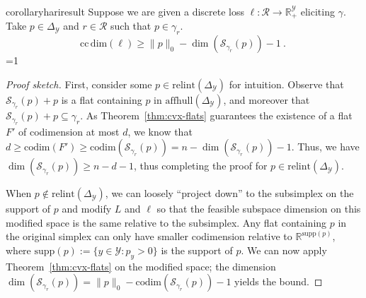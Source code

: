 \documentclass{article}
\newcommand{\Comments}{1}
\newcommand{\mytodo}[2]{\ifnum\Comments=1%
	\todo[linecolor=#1!80!black,backgroundcolor=#1,bordercolor=#1!80!black]{#2}\fi}
\newcommand{\btw}[1]{\mytodo{gray!10!white}{\textcolor{gray}{BTW: #1}}}%
\newcommand{\reals}{\mathbb{R}}
\newcommand{\simplex}{\Delta_\Y}
\newcommand{\relint}[1]{\mathrm{relint}(#1)}
\newcommand{\ccdim}{\mathrm{cc\,dim}}
\newcommand{\codim}{\mathrm{codim}}
\newcommand{\supp}{\mathrm{supp}}
\newcommand{\affhull}{\mathrm{affhull}}
\newcommand{\R}{\mathcal{R}}
\newcommand{\Sc}{\mathcal{S}}  %
\newcommand{\Y}{\mathcal{Y}}
\begin{document}
\begin{restatable}{corollary}{hariresult}\label{cor:fsd-bound}
	Suppose we are given a discrete loss $\ell:\R \to \reals^\Y_+$ eliciting $\gamma$.
	Take $p \in \simplex$ and $r \in \R$ such that $p \in \gamma_r$.
	\begin{equation}
	\ccdim(\ell) \geq \|p\|_0 - \dim(\Sc_{\gamma_r}(p)) - 1~.~
	\end{equation}\btw{TODO: add minnability}
\end{restatable}
\begin{proof}[Proof sketch]
	First, consider some $p \in \relint{\simplex}$ for intuition.
	Observe that $\Sc_{\gamma_r}(p) + p$ is a flat containing $p$ in $\affhull(\simplex)$, and moreover that  $\Sc_{\gamma_r}(p) + p \subseteq \gamma_r$.
	As Theorem~\ref{thm:cvx-flats} guarantees the existence of a flat $F'$ of codimension at most $d$, we know that $d \geq \codim(F') \geq \codim(\Sc_{\gamma_r}(p)) = n- \dim(\Sc_{\gamma_r}(p)) - 1$.
	Thus, we have $\dim(\Sc_{\gamma_r}(p)) \geq n - d - 1$, thus completing the proof for $p \in \relint{\simplex}$.
	
	When $p \not \in \relint{\simplex}$, we can loosely ``project down'' to the subsimplex on the support of $p$ and modify $L$ and $\ell$ so that the feasible subspace dimension on this modified space is the same relative to the subsimplex.
	Any flat containing $p$ in the original simplex can only have smaller codimension relative to $\reals^{\supp(p)}$, where $\supp(p):=\{y\in\Y:p_y > 0\}$ is the support of $p$.
	We can now apply Theorem~\ref{thm:cvx-flats} on the modified space; the dimension $\dim(\Sc_{\gamma_r}(p)) = \|p\|_0 - \codim(\Sc_{\gamma_r}(p)) - 1$ yields the bound.
\end{proof}
\end{document}
